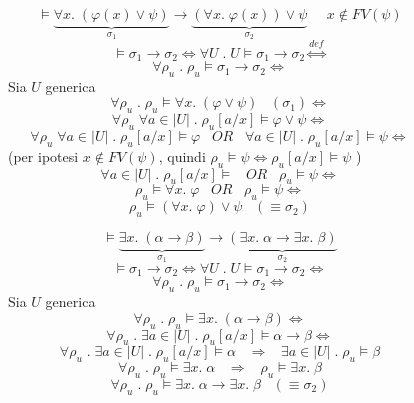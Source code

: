\documentclass{article}
\theoremstyle{break}
\theoremstyle{break}
\theoremstyle{break}
\theoremstyle{break}
\begin{document}
\begin{figure}[H]
  \begin{exercise}
    \[
      \models \underbrace{\forall x.\; (\varphi(x) \vee \psi )}_{\sigma_1} \to \underbrace{(\forall x.\; \varphi(x)) \vee \psi}_{\sigma_2} \;\;\;\;\; x \notin FV(\psi )
    \] 
    \[
    \models \sigma_1 \to \sigma_2 \Leftrightarrow \forall U \;.\; U \models \sigma_1 \to \sigma_2 \stackrel{def}{\Leftrightarrow}
    \] 
    \[
    \forall \rho_u \;.\; \rho_u \models \sigma_1 \to \sigma_2 \Leftrightarrow
    \] 
    Sia \( U \) generica
    \[
      \forall \rho_u \;.\; \rho_u \models \forall x.\; (\varphi \vee \psi) \;\;\; (\sigma_1) \Leftrightarrow
    \] 
    \[
      \forall \rho_u \;\forall a \in |U| \;.\; \rho_u [a/x] \models \varphi \vee \psi \Leftrightarrow
    \] 
    \[
     \forall \rho_u\; \forall a \in |U| \;.\; \rho_u [a/x] \models \varphi \;\;\;OR\;\;\; \forall a \in |U| \;.\; \rho_u [a/x] \models \psi \Leftrightarrow
    \] 
    (per ipotesi \( x \notin FV(\psi ) \), quindi \( \rho_u \models \psi \Leftrightarrow \rho_u [a/x] \models \psi  \) )
    \[
      \forall a \in |U| \;.\; \rho_u [a/x] \models \;\;\;OR\;\;\; \rho_u \models \psi \Leftrightarrow
    \] 
    \[
      \rho_u \models \forall x.\; \varphi \;\;\;OR\;\;\; \rho_u \models \psi \Leftrightarrow 
    \] 
    \[
    \rho_u \models (\forall x.\; \varphi ) \vee \psi \;\;\; (\equiv \sigma_2)
    \] 
  \end{exercise}
\end{figure}

\begin{figure}[H]
  \begin{exercise}
    \[
      \models \underbrace{\exists x.\; (\alpha \to \beta)}_{\sigma_1} \to \underbrace{(\exists x.\; \alpha \to \exists x.\; \beta)}_{\sigma_2}
    \] 
    \[
    \models \sigma_1 \to \sigma_2 \Leftrightarrow \forall U \;.\; U \models \sigma_1 \to \sigma_2 \Leftrightarrow
    \] 
    \[
    \forall \rho_u \;.\; \rho_u \models \sigma_1 \to \sigma_2 \Leftrightarrow
    \] 
    Sia \( U \) generica
    \[
      \forall \rho_u \;.\; \rho_u \models \exists x.\; (\alpha \to  \beta) \Leftrightarrow
    \] 
    \[
      \forall \rho_u \;.\; \exists a \in |U| \;.\; \rho_u[a/x] \models \alpha \to \beta \Leftrightarrow
    \] 
    \[
      \forall \rho_u \;.\; \exists a \in |U| \;.\; \rho_u[a/x] \models \alpha \;\;\; \Rightarrow \;\;\; \exists a \in |U| \;.\; \rho_u \models \beta
    \] 
    \[
      \forall \rho_u \;.\; \rho_u \models \exists x.\; \alpha \;\;\; \Rightarrow \;\;\; \rho_u \models \exists x.\; \beta
    \] 
    \[
    \forall \rho_u \;.\; \rho_u \models \exists x.\; \alpha \to \exists x.\; \beta \;\;\; (\equiv \sigma_2)
    \] 
  \end{exercise}
\end{figure}
\end{document}
